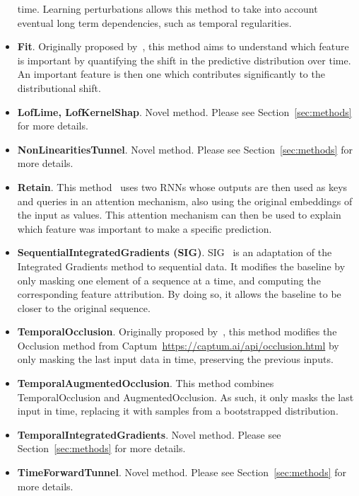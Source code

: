 \begin{itemize}
        time.
        Learning perturbations allows this method to take into account eventual long term dependencies, such as
        temporal regularities.
    \item \textbf{Fit}.
        Originally proposed by~\citep{tonekaboni2020went}, this method aims to understand which feature is important by
        quantifying the shift in the predictive distribution over time.
        An important feature is then one which contributes significantly to the distributional shift.
    \item \textbf{LofLime, LofKernelShap}.
        Novel method.
        Please see Section~\ref{sec:methods} for more details.
    \item \textbf{NonLinearitiesTunnel}.
        Novel method.
        Please see Section~\ref{sec:methods} for more details.
    \item \textbf{Retain}.
        This method~\citep{choi2016retain} uses two RNNs whose outputs are then used as keys and queries in an attention
        mechanism, also using the original embeddings of the input as values.
        This attention mechanism can then be used to explain which feature was important to make a specific prediction.
    \item \textbf{SequentialIntegratedGradients (SIG)}.
        SIG~\citep{enguehard2023sequential} is an adaptation of the Integrated Gradients method to sequential data.
        It modifies the baseline by only masking one element of a sequence at a time, and computing the corresponding
        feature attribution.
        By doing so, it allows the baseline to be closer to the original sequence.
    \item \textbf{TemporalOcclusion}.
        Originally proposed by~\citep{tonekaboni2020went}, this method modifies the Occlusion method from
        Captum~\url{https://captum.ai/api/occlusion.html} by only masking the last input data in time, preserving the
        previous inputs.
    \item \textbf{TemporalAugmentedOcclusion}.
        This method combines TemporalOcclusion and AugmentedOcclusion.
        As such, it only masks the last input in time, replacing it with samples from a bootstrapped distribution.
    \item \textbf{TemporalIntegratedGradients}.
        Novel method.
        Please see Section~\ref{sec:methods} for more details.
    \item \textbf{TimeForwardTunnel}.
        Novel method.
        Please see Section~\ref{sec:methods} for more details.

\end{itemize}


